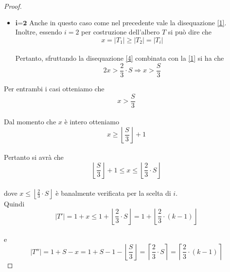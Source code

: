 \begin{proof}
\begin{itemize}
\\		
	Sottraendo la disequazione \eqref{2} alla \eqref{1} si ottiene che 
	\\
	\begin{equation}\label{3}
	x > \frac{2}{3}\cdot S - \frac{S}{3} = \frac{S}{3}	
	\end{equation}
 	\item $ \textbf{i=2} $ Anche in questo caso come nel precedente vale la disequazione \eqref{1}.\\
 	Inoltre, essendo $ i = 2 $ per costruzione dell'albero $ T $ si pu\`o dire che
 	\\
 	\begin{equation}\label{4}
 	x = |T_1| \ge |T_2| = |T_i|
 	\end{equation}
 	\\
 	Pertanto, sfruttando la disequazione \eqref{4} combinata con la \eqref{1} si ha che
 	\\
 	\begin{equation}\label{5}
 	2x > \frac{2}{3} \cdot S \Rightarrow x > \frac{S}{3}
 	\end{equation}
	\end{itemize}
Per entrambi i casi otteniamo che 
\\
\[ x > \frac{S}{3} \]
\\
Dal momento che $ x $ \`e intero otteniamo 
\\
\[ x \ge \left\lfloor \frac{S}{3}\right\rfloor  + 1\]
\\
Pertanto si avr\`a che 
\\
\begin{equation}\label{6}
	\left\lfloor \frac{S}{3}\right\rfloor  + 1 \le x \le \left\lfloor \frac{2}{3}\cdot S \right\rfloor
\end{equation} 
\\
dove $  x \le \left\lfloor \frac{2}{3}\cdot S \right\rfloor $ \`e banalmente verificata per la scelta di $ i $.
\\
Quindi 
\\
\begin{equation}\label{7}
|T'| = 1+x \le 1 + \left\lfloor \frac{2}{3}\cdot S \right\rfloor = 1 + \left\lfloor \frac{2}{3} \cdot (k-1) \right\rfloor	
\end{equation}
\\
e
\\
\begin{equation}\label{8}
|T''| = 1 + S - x = 1+S-1 - \left\lfloor \frac{S}{3}\right\rfloor = \left\lceil \frac{2}{3}\cdot S \right\rceil = \left\lceil \frac{2}{3} \cdot (k-1) \right\rceil 	

\end{equation}
\end{proof}
